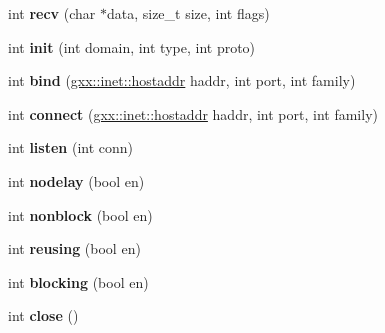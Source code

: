 \begin{DoxyCompactItemize}
\item 
int {\bfseries recv} (char $\ast$data, size\+\_\+t size, int flags)\hypertarget{structgxx_1_1inet_1_1socket_a37eca52184ced646189ad5f0c6e82a45}{}\label{structgxx_1_1inet_1_1socket_a37eca52184ced646189ad5f0c6e82a45}

\item 
int {\bfseries init} (int domain, int type, int proto)\hypertarget{structgxx_1_1inet_1_1socket_a683e1a4ed116958f02469a9c1ae7d33e}{}\label{structgxx_1_1inet_1_1socket_a683e1a4ed116958f02469a9c1ae7d33e}

\item 
int {\bfseries bind} (\hyperlink{classgxx_1_1hostaddr}{gxx\+::inet\+::hostaddr} haddr, int port, int family)\hypertarget{structgxx_1_1inet_1_1socket_a785380a21643bcdc83a6f81eac8f2cec}{}\label{structgxx_1_1inet_1_1socket_a785380a21643bcdc83a6f81eac8f2cec}

\item 
int {\bfseries connect} (\hyperlink{classgxx_1_1hostaddr}{gxx\+::inet\+::hostaddr} haddr, int port, int family)\hypertarget{structgxx_1_1inet_1_1socket_a4b3a9d3a51f92ebd29b4b402351bae13}{}\label{structgxx_1_1inet_1_1socket_a4b3a9d3a51f92ebd29b4b402351bae13}

\item 
int {\bfseries listen} (int conn)\hypertarget{structgxx_1_1inet_1_1socket_abacb6ac85be4192023f84e74f4c6340f}{}\label{structgxx_1_1inet_1_1socket_abacb6ac85be4192023f84e74f4c6340f}

\item 
int {\bfseries nodelay} (bool en)\hypertarget{structgxx_1_1inet_1_1socket_acae888b1d58ec2992227010c3ed40505}{}\label{structgxx_1_1inet_1_1socket_acae888b1d58ec2992227010c3ed40505}

\item 
int {\bfseries nonblock} (bool en)\hypertarget{structgxx_1_1inet_1_1socket_a2e229b643a3b32cd9ec8a4b90c12d957}{}\label{structgxx_1_1inet_1_1socket_a2e229b643a3b32cd9ec8a4b90c12d957}

\item 
int {\bfseries reusing} (bool en)\hypertarget{structgxx_1_1inet_1_1socket_a627afb082eaf29203a6e8e17e15108cb}{}\label{structgxx_1_1inet_1_1socket_a627afb082eaf29203a6e8e17e15108cb}

\item 
int {\bfseries blocking} (bool en)\hypertarget{structgxx_1_1inet_1_1socket_ad12aafcd4b12a38ea6b7b63c679ddc02}{}\label{structgxx_1_1inet_1_1socket_ad12aafcd4b12a38ea6b7b63c679ddc02}

\item 
int {\bfseries close} ()\hypertarget{structgxx_1_1inet_1_1socket_aeb20472fff1ed85e8341b84e01269d5d}{}\label{structgxx_1_1inet_1_1socket_aeb20472fff1ed85e8341b84e01269d5d}

\end{DoxyCompactItemize}
